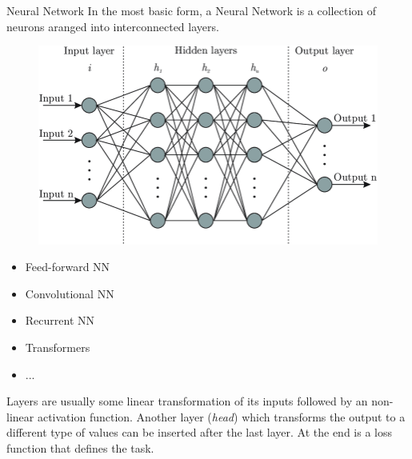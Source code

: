 \documentclass{beamer}
\begin{document}
\begin{frame}{Neural Network}
    In the most basic form, a Neural Network is a collection of neurons aranged into interconnected layers.

    \vfill

    \begin{minipage}{0.45\textwidth}
        \begin{figure}
            \centering
            \includegraphics[width=\textwidth]{./images/12_nn.png}
        \end{figure}
    \end{minipage}
    \begin{minipage}{0.45\textwidth}
        \begin{itemize}
            \item Feed-forward NN
            \item Convolutional NN
            \item Recurrent NN
            \item Transformers
            \item ...
        \end{itemize}
    \end{minipage}

    \vfill

    Layers are usually some linear transformation of its inputs followed by an non-linear activation function.
    Another layer (\textit{head}) which transforms the output to a different type of values can be inserted after the last layer.
    At the end is a loss function that defines the task.
\end{frame}
\end{document}

